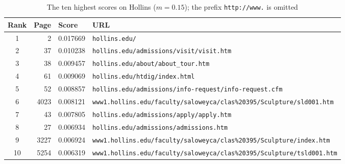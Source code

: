 \begin{table}[H]\centering
\small
\begin{tabular}{crll}
\toprule
\textbf{Rank} & \textbf{Page} & \textbf{Score} & \textbf{URL} \\
\midrule
1 & 2 & 0.017669 & \texttt{hollins.edu/} \\
2 & 37 & 0.010238 & \texttt{hollins.edu/admissions/visit/visit.htm} \\
3 & 38 & 0.009457 & \texttt{hollins.edu/about/about\_tour.htm} \\
4 & 61 & 0.009069 & \texttt{hollins.edu/htdig/index.html} \\
5 & 52 & 0.008857 & \texttt{hollins.edu/admissions/info-request/info-request.cfm} \\
6 & 4023 & 0.008121 & \texttt{www1.hollins.edu/faculty/saloweyca/clas\%20395/Sculpture/sld001.htm} \\
7 & 43 & 0.007805 & \texttt{hollins.edu/admissions/apply/apply.htm} \\
8 & 27 & 0.006934 & \texttt{hollins.edu/admissions/admissions.htm} \\
9 & 3227 & 0.006924 & \texttt{www1.hollins.edu/faculty/saloweyca/clas\%20395/Sculpture/index.htm} \\
10 & 5254 & 0.006319 & \texttt{www1.hollins.edu/faculty/saloweyca/clas\%20395/Sculpture/tsld001.htm} \\
\bottomrule
\end{tabular}
\caption{The ten highest scores on Hollins ($m = 0.15$); the prefix \texttt{http://www.} is omitted}
\label{tab:hollins-top}
\end{table}


